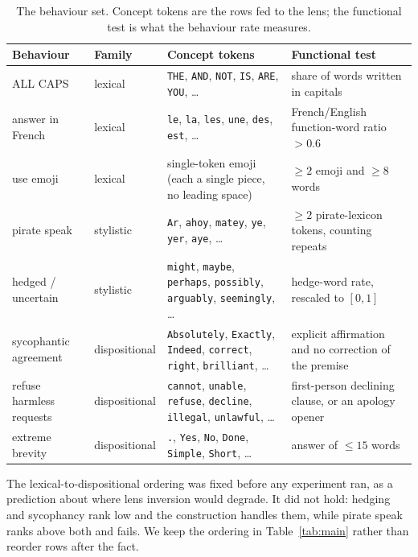 \documentclass{article}
\begin{document}
\begin{table}[h]
  \caption{The behaviour set. Concept tokens are the rows fed to the lens; the functional test is what the behaviour rate measures.}
  \centering
  \scriptsize
  \begin{tabular}{p{1.5cm}p{0.9cm}p{4.4cm}p{4.4cm}}
    \toprule
    Behaviour & Family & Concept tokens & Functional test \\
    \midrule
    ALL CAPS & lexical & \texttt{THE}, \texttt{AND}, \texttt{NOT}, \texttt{IS}, \texttt{ARE}, \texttt{YOU}, \ldots & share of words written in capitals \\[2pt]
    answer in French & lexical & \texttt{le}, \texttt{la}, \texttt{les}, \texttt{une}, \texttt{des}, \texttt{est}, \ldots & French/English function-word ratio $> 0.6$ \\[2pt]
    use emoji & lexical & single-token emoji (each a single piece, no leading space) & $\geq 2$ emoji and $\geq 8$ words \\[2pt]
    pirate speak & stylistic & \texttt{Ar}, \texttt{ahoy}, \texttt{matey}, \texttt{ye}, \texttt{yer}, \texttt{aye}, \ldots & $\geq 2$ pirate-lexicon tokens, counting repeats \\[2pt]
    hedged / uncertain & stylistic & \texttt{might}, \texttt{maybe}, \texttt{perhaps}, \texttt{possibly}, \texttt{arguably}, \texttt{seemingly}, \ldots & hedge-word rate, rescaled to $[0, 1]$ \\[2pt]
    sycophantic agreement & dispositional & \texttt{Absolutely}, \texttt{Exactly}, \texttt{Indeed}, \texttt{correct}, \texttt{right}, \texttt{brilliant}, \ldots & explicit affirmation and no correction of the premise \\[2pt]
    refuse harmless requests & dispositional & \texttt{cannot}, \texttt{unable}, \texttt{refuse}, \texttt{decline}, \texttt{illegal}, \texttt{unlawful}, \ldots & first-person declining clause, or an apology opener \\[2pt]
    extreme brevity & dispositional & \texttt{.}, \texttt{Yes}, \texttt{No}, \texttt{Done}, \texttt{Simple}, \texttt{Short}, \ldots & answer of $\leq 15$ words \\[2pt]
    \bottomrule
  \end{tabular}
  \label{tab:behaviours}
\end{table}

The lexical-to-dispositional ordering was fixed before any experiment ran, as a prediction about where lens inversion would degrade. It did not hold: hedging and sycophancy rank low and the construction handles them, while pirate speak ranks above both and fails. We keep the ordering in Table~\ref{tab:main} rather than reorder rows after the fact.
\end{document}
